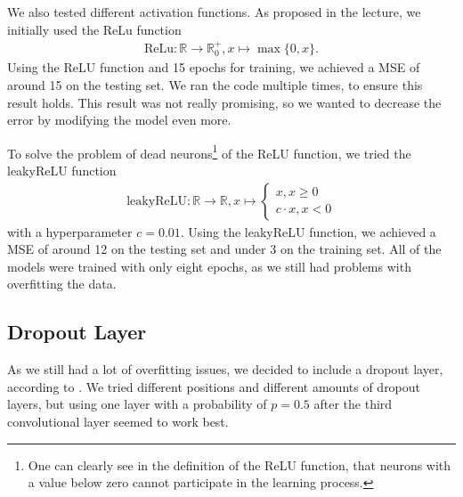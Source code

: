 \documentclass[conference]{IEEEtran}
\begin{document}
We also tested different activation functions. As proposed in the lecture, we initially used the ReLu
function
\begin{align*}
\mathrm{ReLu}: \mathbb{R} \to \mathbb{R}_0^+, x \mapsto \max\{0,x\}.
\end{align*}
Using the ReLU function and 15 epochs for training, we achieved a MSE of around 15 on the 
testing set. We ran the code multiple times, to ensure this result holds. This result was not really 
promising, so we wanted to decrease the error by modifying the model even more.

To solve the problem of dead neurons\footnote{One can clearly see in the definition of the ReLU 
function, that neurons with a value below zero cannot participate in the learning process.} of the ReLU function, we 
tried the leakyReLU function
\begin{align*}
\mathrm{leakyReLU} : \mathbb{R} \to \mathbb{R}, x \mapsto \begin{cases}
x, x \geq 0\\
c \cdot x, x <0
\end{cases}
\end{align*}
with a hyperparameter $c = 0.01$. Using the leakyReLU function, we achieved a MSE of around 12 on the 
testing set and under 3 on the training set. All of the models were trained with only eight epochs, as 
we still had problems with overfitting the data.

\subsection{Dropout Layer}
As we still had a lot of overfitting issues, we decided to include a dropout layer, according to 
\cite{Dropout2014}. We tried different positions and different amounts of dropout layers, but using one 
layer with a probability of $p=0.5$ after the third convolutional layer seemed to work best.
\end{document}
